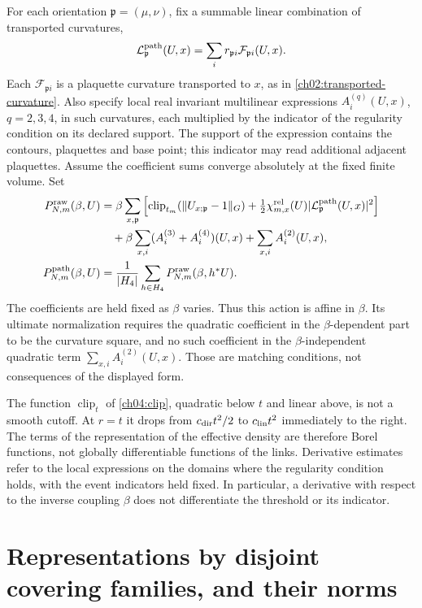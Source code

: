 For each orientation $\mathfrak p=(\mu,\nu)$, fix a summable linear
combination of transported curvatures,
\[
 \mathcal L^{\rm path}_{\mathfrak p}(U,x)
      =\sum_i r_{\mathfrak p i}\mathcal F_{\mathfrak p i}(U,x).
\]
Each $\mathcal F_{\mathfrak p i}$ is a plaquette curvature transported to
$x$, as in \eqref{ch02:transported-curvature}. Also specify local real
invariant multilinear expressions $A_i^{(q)}(U,x)$, $q=2,3,4$, in such
curvatures, each multiplied by the indicator of the regularity condition on its declared
support. The support of the expression contains the contours, plaquettes and base point; this
indicator may read additional adjacent plaquettes. Assume the coefficient sums
converge absolutely at the fixed finite volume. Set
\begin{align}
 P^{\rm raw}_{N,m}(\beta,U)
 &=\beta\sum_{x,\mathfrak p}
    \left[\operatorname{clip}_{t_m}(\|U_{x;\mathfrak p}-1\|_G)
       +\tfrac12\chi^{\rm rel}_{m,x}(U)
                    |\mathcal L^{\rm path}_{\mathfrak p}(U,x)|^2\right]
 \notag\\
 &\quad+\beta\sum_{x,i}(A_i^{(3)}+A_i^{(4)})(U,x)
                     +\sum_{x,i}A_i^{(2)}(U,x),\\
 P^{\rm path}_{N,m}(\beta,U)
 &=\frac1{|H_4|}\sum_{h\in H_4}P^{\rm raw}_{N,m}(\beta,h^*U).
 \label{ch04:path-action}
\end{align}
The coefficients are held fixed as $\beta$ varies. Thus this action is
affine in $\beta$. Its ultimate normalization requires the quadratic
coefficient in the $\beta$-dependent part to be the curvature square,
and no such coefficient in the $\beta$-independent quadratic term $\sum_{x,i}A_i^{(2)}(U,x)$. Those are
matching conditions, not consequences of the displayed form.

The function $\operatorname{clip}_t$ of \eqref{ch04:clip}, quadratic below $t$ and linear above, is not a smooth cutoff.
At $r=t$ it drops from $c_{\rm dir}t^2/2$ to $c_{\rm lin}t^2$ immediately
to the right. The terms of the representation of the effective density are therefore Borel functions,
not globally differentiable functions of the links. Derivative estimates
refer to the local expressions on the domains where the regularity condition holds, with the event indicators
held fixed. In particular, a derivative with respect to the inverse coupling $\beta$
does not differentiate the threshold or its indicator.

\section{Representations by disjoint covering families, and their norms}
\label{ch04:density-norms}

